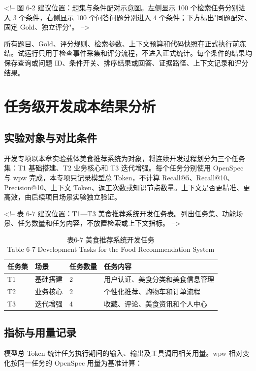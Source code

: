 <!-- 图 6-2 建议位置：题集与条件配对示意图。左侧显示 100 个检索任务分别进入 3 个条件，右侧显示 100 个问答问题分别进入 4 个条件；下方标出"同题配对、固定 Gold、独立评分"。 -->

所有题目、Gold、评分规则、检索参数、上下文预算和代码快照在正式执行前冻结。试运行只用于检查事件采集和评分流程，不进入正式统计。每个条件的结果均保存查询或问题 ID、条件开关、排序结果或回答、证据路径、上下文记录和评分结果。


\section{任务级开发成本结果分析}

\subsection{实验对象与对比条件}
开发专项以本章实验载体美食推荐系统为对象，将连续开发过程划分为三个任务集：T1 基础搭建、T2 业务核心和 T3 迭代增强。每个任务分别使用 OpenSpec 与 wpw 完成，本专项只记录模型总 Token，不计算 Recall@5、Recall@10、Precision@10、上下文 Token、返工次数或知识节点数量。上下文是否更精准、更高效，由后续项目场景实验独立验证。

<!-- 表 6-7 建议位置：T1—T3 美食推荐系统开发任务表。列出任务集、功能场景、任务数量和任务内容，不放置检索或上下文指标。 -->

\begin{table}[htbp]
\centering
\small
\caption{表6-7 美食推荐系统开发任务\\Table 6-7 Development Tasks for the Food Recommendation System}
\begin{tabularx}{\textwidth}{|X|X|X|X|}
\hline
\textbf{任务集} & \textbf{场景} & \textbf{任务数量} & \textbf{任务内容} \\
\hline
T1 & 基础搭建 & 2 & 用户认证、美食分类和美食信息管理 \\
T2 & 业务核心 & 2 & 个性化推荐、购物车和订单流程 \\
T3 & 迭代增强 & 4 & 收藏、评论、美食资讯和个人中心 \\
\hline
\end{tabularx}
\end{table}


\subsection{指标与用量记录}
模型总 Token 统计任务执行期间的输入、输出及工具调用相关用量。wpw 相对变化按同一任务的 OpenSpec 用量为基准计算：

